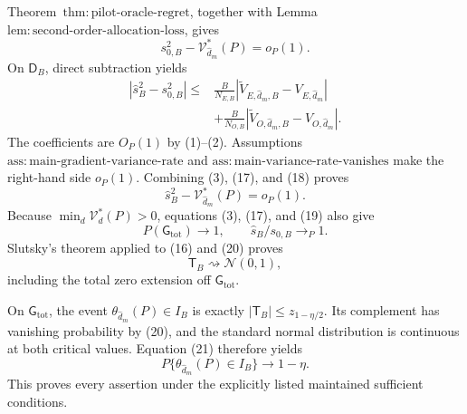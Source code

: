 Theorem~\(\mathrm{thm{:}pilot\text{-}oracle\text{-}regret}\), together with Lemma~\(\mathrm{lem{:}second\text{-}order\text{-}allocation\text{-}loss}\), gives
\[
 s_{0,B}^2-\mathcal V_{\widehat d_m}^*(P)=o_P(1).              \tag{17}
\]
On \(\mathsf D_B\), direct subtraction yields
\[
\begin{aligned}
 |\widehat s_B^2-s_{0,B}^2|
 \le{}&\frac{B}{N_{E,B}}
 |\widetilde V_{E,\widehat d_m,B}-V_{E,\widehat d_m}|\\
 &+\frac{B}{N_{O,B}}
 |\widetilde V_{O,\widehat d_m,B}-V_{O,\widehat d_m}|.
                                                                    \tag{18}
\end{aligned}
\]
The coefficients are \(O_P(1)\) by (1)--(2).  Assumptions~\(\mathrm{ass{:}main\text{-}gradient\text{-}variance\text{-}rate}\) and \(\mathrm{ass{:}main\text{-}variance\text{-}rate\text{-}vanishes}\) make the right-hand side \(o_P(1)\).  Combining (3), (17), and (18) proves
\[
 \widehat s_B^2-\mathcal V_{\widehat d_m}^*(P)=o_P(1).        \tag{19}
\]
Because \(\min_d\mathcal V_d^*(P)>0\), equations (3), (17), and (19) also give
\[
 P(\mathsf G_{\mathrm{tot}})\longrightarrow1,
 \qquad \widehat s_B/s_{0,B}\longrightarrow_P1.              \tag{20}
\]
Slutsky's theorem applied to (16) and (20) proves
\[
 \mathsf T_B\rightsquigarrow\mathcal N(0,1),                 \tag{21}
\]
including the total zero extension off \(\mathsf G_{\mathrm{tot}}\).

On \(\mathsf G_{\mathrm{tot}}\), the event \(\theta_{\widehat d_m}(P)\in I_B\) is exactly \(|\mathsf T_B|\le z_{1-\eta/2}\).  Its complement has vanishing probability by (20), and the standard normal distribution is continuous at both critical values.  Equation (21) therefore yields
\[
 P\{\theta_{\widehat d_m}(P)\in I_B\}\longrightarrow1-\eta.
\]
This proves every assertion under the explicitly listed maintained sufficient conditions.